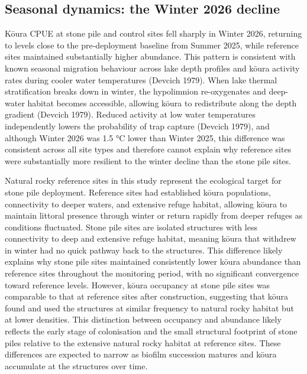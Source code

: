 \documentclass[
  12pt,
  a4paper,
  oneside]{scrbook}
\begin{document}
\subsection{Seasonal dynamics: the Winter 2026
decline}\label{seasonal-dynamics-the-winter-2026-decline}

Kōura CPUE at stone pile and control sites fell sharply in Winter 2026,
returning to levels close to the pre-deployment baseline from Summer
2025, while reference sites maintained substantially higher abundance.
This pattern is consistent with known seasonal migration behaviour
across lake depth profiles and kōura activity rates during cooler water
temperatures (Devcich 1979). When lake thermal stratification breaks
down in winter, the hypolimnion re-oxygenates and deep-water habitat
becomes accessible, allowing kōura to redistribute along the depth
gradient (Devcich 1979). Reduced activity at low water temperatures
independently lowers the probability of trap capture (Devcich 1979), and
although Winter 2026 was 1.5 °C lower than Winter 2025, this difference
was consistent across all site types and therefore cannot explain why
reference sites were substantially more resilient to the winter decline
than the stone pile sites.

Natural rocky reference sites in this study represent the ecological
target for stone pile deployment. Reference sites had established kōura
populations, connectivity to deeper waters, and extensive refuge
habitat, allowing kōura to maintain littoral presence through winter or
return rapidly from deeper refuges as conditions fluctuated. Stone pile
sites are isolated structures with less connectivity to deep and
extensive refuge habitat, meaning kōura that withdrew in winter had no
quick pathway back to the structures. This difference likely explains
why stone pile sites maintained consistently lower kōura abundance than
reference sites throughout the monitoring period, with no significant
convergence toward reference levels. However, kōura occupancy at stone
pile sites was comparable to that at reference sites after construction,
suggesting that kōura found and used the structures at similar frequency
to natural rocky habitat but at lower densities. This distinction
between occupancy and abundance likely reflects the early stage of
colonisation and the small structural footprint of stone piles relative
to the extensive natural rocky habitat at reference sites. These
differences are expected to narrow as biofilm succession matures and
kōura accumulate at the structures over time.
\end{document}
